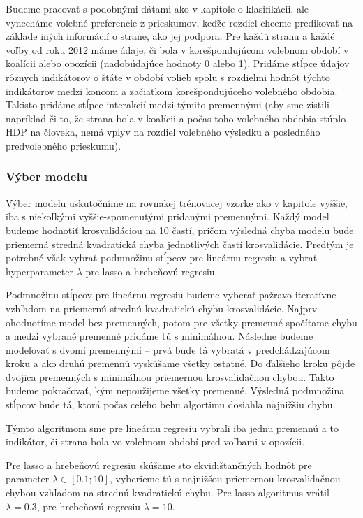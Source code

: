 \documentclass[main.tex]{subfiles}
\begin{document}
Budeme pracovať s podobnými dátami ako v kapitole o klasifikácii, ale vynecháme volebné preferencie z prieskumov, keďže rozdiel chceme predikovať na základe iných informácií o strane, ako jej podpora. Pre každú stranu a každé voľby od roku 2012 máme údaje, či bola v korešpondujúcom volebnom období v koalícii alebo opozícii (nadobúdajúce hodnoty 0 alebo 1). Pridáme stĺpce údajov rôznych indikátorov o štáte v období volieb spolu s rozdielmi hodnôt týchto indikátorov medzi koncom a začiatkom korešpondujúceho volebného obdobia. Takisto pridáme stĺpce interakcií medzi týmito premennými (aby sme zistili napríklad či to, že strana bola v koalícii a počas toho volebného obdobia stúplo HDP na človeka, nemá vplyv na rozdiel volebného výsledku a posledného predvolebného prieskumu).

\subsubsection{Výber modelu}

Výber modelu uskutočníme na rovnakej trénovacej vzorke ako v kapitole vyššie, iba s niekoľkými vyššie-spomenutými pridanými premennými. Každý model budeme hodnotiť krosvalidáciou na 10 častí, pričom výsledná chyba modelu bude priemerná stredná kvadratická chyba jednotlivých častí krosvalidácie. Predtým je potrebné však vybrať podmnožinu stĺpcov pre lineárnu regresiu a vybrať hyperparameter $\lambda$ pre lasso a hrebeňovú regresiu. 

Podmnožinu stĺpcov pre lineárnu regresiu budeme vyberať pažravo iteratívne vzhľadom na priemernú strednú kvadratickú chybu krosvalidácie. Najprv ohodnotíme model bez premenných, potom pre všetky premenné spočítame chybu a medzi vybrané premenné pridáme tú s minimálnou. Následne budeme modelovať s dvomi premennými -- prvá bude tá vybratá v predchádzajúcom kroku a ako druhú premennú vyskúšame všetky ostatné. Do ďalšieho kroku pôjde dvojica premenných s minimálnou priemernou krosvalidačnou chybou. Takto budeme pokračovať, kým nepoužijeme všetky premenné. Výsledná podmnožina stĺpcov bude tá, ktorá počas celého behu algortimu dosiahla najnižšiu chybu. 

Týmto algoritmom sme pre lineárnu regresiu vybrali iba jednu premennú a to indikátor, či strana bola vo volebnom období pred voľbami v opozícii. 

Pre lasso a hrebeňovú regresiu skúšame sto ekvidištančných hodnôt pre parameter $\lambda \in [0.1; 10]$, vyberieme tú s najnižšou priemernou krosvalidačnou chybou vzhľadom na strednú kvadratickú chybu. Pre lasso algoritmus vrátil $\lambda=0.3$, pre hrebeňovú regresiu $\lambda = 10$. 
\end{document}
